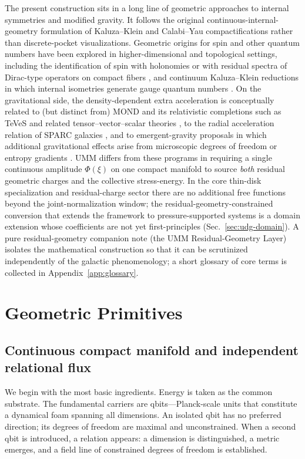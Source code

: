 \documentclass[11pt,a4paper]{article}
\begin{document}
The present construction sits in a long line of geometric approaches to internal symmetries and modified gravity. It follows the original continuous-internal-geometry formulation of Kaluza--Klein \cite{Kaluza1921,Klein1926} and Calabi--Yau compactifications rather than discrete-pocket visualizations. Geometric origins for spin and other quantum numbers have been explored in higher-dimensional and topological settings, including the identification of spin with holonomies or with residual spectra of Dirac-type operators on compact fibers \cite{Bar1992,Trautman1992}, and continuum Kaluza--Klein reductions in which internal isometries generate gauge quantum numbers \cite{Duff1986,Overduin1997}. On the gravitational side, the density-dependent extra acceleration is conceptually related to (but distinct from) MOND \cite{Milgrom1983} and its relativistic completions such as TeVeS and related tensor--vector--scalar theories \cite{Bekenstein2004,Skordis2009}, to the radial acceleration relation of SPARC galaxies \cite{Lelli2016,McGaugh2016}, and to emergent-gravity proposals in which additional gravitational effects arise from microscopic degrees of freedom or entropy gradients \cite{Verlinde2017,Padmanabhan2010}. UMM differs from these programs in requiring a single continuous amplitude \(\Phi(\xi)\) on one compact manifold to source \emph{both} residual geometric charges and the collective stress-energy. In the core thin-disk specialization and residual-charge sector there are no additional free functions beyond the joint-normalization window; the residual-geometry-constrained conversion that extends the framework to pressure-supported systems is a domain extension whose coefficients are not yet first-principles (Sec.~\ref{sec:udg-domain}). A pure residual-geometry companion note (the UMM Residual-Geometry Layer) isolates the mathematical construction so that it can be scrutinized independently of the galactic phenomenology; a short glossary of core terms is collected in Appendix~\ref{app:glossary}.

\section{Geometric Primitives}
\label{sec:primitives}

\subsection{Continuous compact manifold and independent relational flux}

We begin with the most basic ingredients. Energy is taken as the common substrate. The fundamental carriers are qbits---Planck-scale units that constitute a dynamical foam spanning all dimensions. An isolated qbit has no preferred direction; its degrees of freedom are maximal and unconstrained. When a second qbit is introduced, a relation appears: a dimension is distinguished, a metric emerges, and a field line of constrained degrees of freedom is established.
\end{document}
